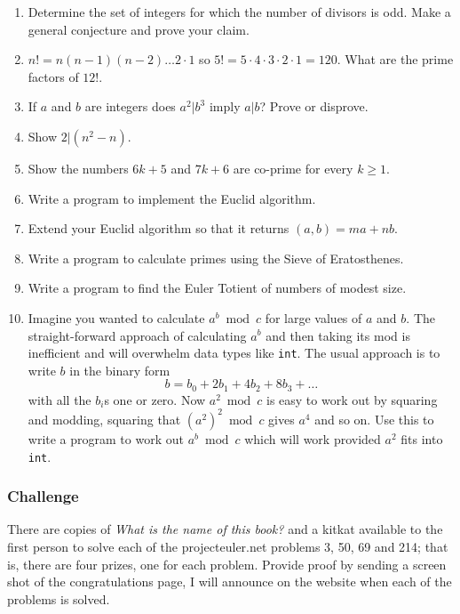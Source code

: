 \documentclass[12pt]{article}
\begin{document}
\begin{enumerate}

\item Determine the set of integers for which the number of divisors is odd. Make a general conjecture and prove your claim.

\item $n!=n(n-1)(n-2)\ldots 2\cdot 1$ so $5!=5\cdot 4\cdot 3\cdot
  2\cdot 1=120$. What are the prime factors of $12!$.

\item If $a$ and $b$ are integers does $a^2|b^3$ imply $a|b$? Prove or disprove.

\item Show $2|(n^2-n)$.

\item Show the numbers $6k+5$ and $7k+6$ are co-prime for every $k\ge 1$.

\item Write a program to implement the Euclid algorithm.

\item Extend your Euclid algorithm  so that it returns $(a,b)=ma+nb$.

\item Write a program to calculate primes using the Sieve of Eratosthenes.

\item Write a program to find the Euler Totient of numbers of modest size. 

\item Imagine you wanted to calculate $a^b\bmod c$ for large values of
  $a$ and $b$. The straight-forward approach of calculating $a^b$ and
  then taking its mod is inefficient and will overwhelm data types
  like \texttt{int}. The usual approach is to write $b$ in the binary form
\begin{equation}
b=b_0+2b_1+4b_2+8b_3+\ldots
\end{equation}
with all the $b_i$s one or zero. Now $a^2\bmod c$ is easy to work out
by squaring and modding, squaring that $(a^2)^2\bmod c$ gives $a^4$
and so on. Use this to write a program to work out $a^b\bmod c$ which
will work provided $a^2$ fits into \texttt{int}.

\end{enumerate}


\subsubsection*{Challenge}

There are copies of \emph{What is the name of this book?} and a kitkat
available to the first person to solve each of the projecteuler.net
problems 3, 50, 69 and 214; that is, there are four prizes, one for each
problem. Provide proof by sending a screen shot of the congratulations
page, I will announce on the website when each of the problems is solved.
\end{document}
